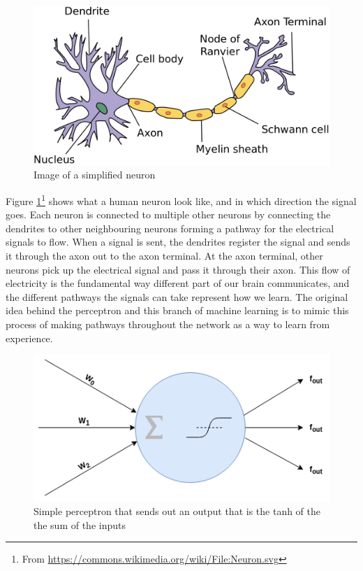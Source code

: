 \begin{figure}[h]
        \centering
        \includegraphics[scale=0.3]{background/figures/neuron.png}
        \caption{Image of a simplified neuron}
        \label{fig:neuron}
\end{figure}


Figure \ref{fig:neuron}\footnote{From \url{https://commons.wikimedia.org/wiki/File:Neuron.svg}} shows what a human neuron look like, and in which direction the signal goes. Each neuron is connected to multiple other neurons by connecting the dendrites to other neighbouring neurons forming a pathway for the electrical signals to flow. 
When a signal is sent, the dendrites register the signal and sends it through the axon out to the axon terminal. At the axon terminal, other neurons pick up the electrical signal and pass it through their axon.
This flow of electricity is the fundamental way different part of our brain communicates, and the different pathways the signals can take represent how we learn. The original idea behind the perceptron and this branch of machine learning is to mimic this process of making pathways throughout the network as a way to learn from experience.


\begin{figure}
        \centering
        \includegraphics[scale=0.7]{background/figures/perceptron.png}
        \caption{Simple perceptron that sends out an output that is the tanh of the the sum of the inputs}
    \label{fig:perceptron}
\end{figure}





